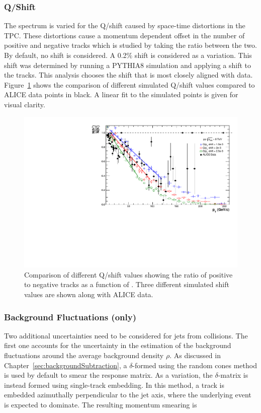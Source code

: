 \subsubsection{Q/\pT Shift}

The spectrum is varied for the Q/\pT shift caused by space-time distortions in the TPC. These distortions cause a momentum dependent offset in the number of positive and negative tracks which is studied by taking the ratio between the two. By default, no shift is considered. A 0.2$\%$ shift is considered as a variation. This shift was determined by running a PYTHIA8 simulation and applying a shift to the tracks. This analysis chooses the shift that is most closely aligned with data. Figure~\ref{fig:QoverPtShift} shows the comparison of different simulated Q/\pT shift values compared to ALICE data points in black. A linear fit to the simulated points is given for visual clarity.


\begin{figure}[hbt!]
    \centering
    \includegraphics[width=15cm]{figures/QoverPtShift/QPTComparison.pdf}
    \caption{Comparison of different Q/\pT shift values showing the ratio of positive to negative tracks as a function of \pT. Three different simulated shift values are shown along with ALICE data.}
    \label{fig:QoverPtShift}
\end{figure}

\subsubsection{Background Fluctuations (\pPb only)}

Two additional uncertainties need to be considered for jets from \pPb collisions. The first one accounts for the uncertainty in the estimation of the background fluctuations around the average background density $\rho$. As discussed in Chapter~\ref{sec:backgroundSubtraction}, a $\delta$-\pT formed using the random cones method is used by default to smear the response matrix. As a variation, the $\delta$-\pT matrix is instead formed using single-track embedding. In this method, a track is embedded azimuthally perpendicular to the jet axis, where the underlying event is expected to dominate. The resulting momentum smearing is

